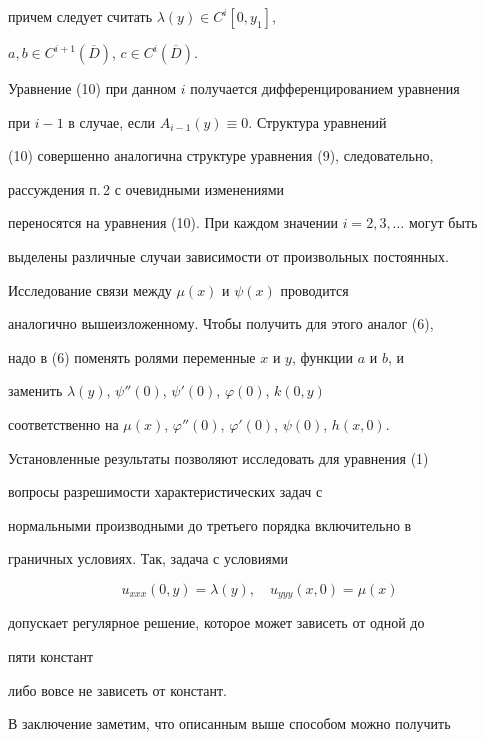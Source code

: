 причем следует считать $\lambda(y)\in C^{i}[0,y_{1}]$,


$a,b\in C^{i+1}(\overline{D})$, $c\in C^{i}(\overline{D})$.


Уравнение (10) при данном $i$ получается дифференцированием уравнения


при $i-1$ в случае, если $A_{i-1}(y)\equiv0$. Структура уравнений


(10) совершенно аналогична структуре уравнения (9), следовательно,


рассуждения п.\,2 с очевидными изменениями


переносятся на уравнения (10). При каждом значении $i=2,3,\dotsc$ могут быть


выделены различные случаи зависимости от произвольных постоянных.





Исследование связи между $\mu(x)$ и $\psi(x)$ проводится


аналогично вышеизложенному. Чтобы получить для этого аналог (6),


надо в (6) поменять ролями переменные $x$ и $y$, функции $a$ и $b$, и


заменить $\lambda(y)$, $\psi''(0)$, $\psi'(0)$, $\varphi(0)$, $k(0,y)$


соответственно на $\mu(x)$, $\varphi''(0)$, $\varphi'(0)$, $\psi(0)$, $h(x,0)$.





Установленные результаты позволяют исследовать для уравнения (1)


вопросы разрешимости характеристических задач с


нормальными производными до третьего порядка включительно в


граничных условиях. Так, задача с условиями


$$


u_{xxx}(0,y)=\lambda(y),\quad u_{yyy}(x,0)=\mu(x)


$$


допускает регулярное решение, которое может зависеть от одной до


пяти констант


либо вовсе не зависеть от констант.








В заключение заметим, что описанным выше способом можно получить


